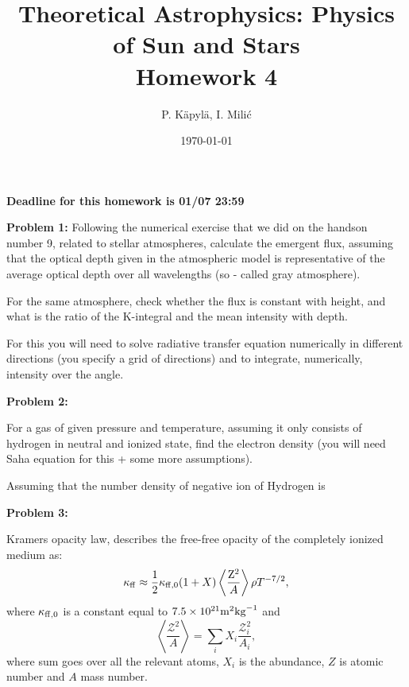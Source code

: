 \documentclass[12pt]{article}
\title{Theoretical Astrophysics: Physics of Sun and Stars\\
Homework 4}
\author{P. K\"{a}pyl\"{a}, I. Mili\'{c}}
\date{\today}
\begin{document}
\maketitle

\textbf{Deadline for this homework is \textbf{01}/07 23:59}

{\bf Problem 1:} Following the numerical exercise that we did on the handson number 9, related to stellar atmospheres, calculate the emergent flux, assuming that the optical depth given in the atmospheric model is representative of the average optical depth over all wavelengths (so - called gray atmosphere).

For the same atmosphere, check whether the flux is constant with height, and what is the ratio of the K-integral and the mean intensity with depth. 

For this you will need to solve radiative transfer equation numerically in different directions (you specify a grid of directions) and to integrate, numerically, intensity over the angle.

{\bf Problem 2:} 

For a gas of given pressure and temperature, assuming it only consists of hydrogen in neutral and ionized state, find the electron density (you will need Saha equation for this + some more assumptions). 

Assuming that the number density of negative ion of Hydrogen is 

{\bf Problem 3:}

Kramers opacity law, describes the free-free opacity of the completely ionized medium as:
\begin{equation}
  \kappa_{\rm ff} \approx \frac{1}{2} \kappa_{\rm ff,0} (1+X) \left< \frac{\rm Z^2}{A} \right> \rho T^{-7/2},
\end{equation}
where $\kappa_{\rm ff,0}$ is a constant equal to $7.5 \times 10^{21} {\rm m}^2 {\rm kg}^{-1}$ and 
\begin{equation}
  \left< \frac{\mathcal Z^2}{A} \right> = \sum_i X_i \frac{\mathcal Z_i^2}{A_i},
\end{equation}
where sum goes over all the relevant atoms, $X_i$ is the abundance, $Z$ is atomic number and $A$ mass number. 
\end{document}
